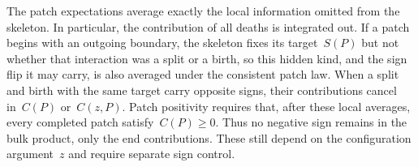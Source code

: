 The patch expectations average exactly the local information omitted from the
skeleton. In particular, the contribution of all  deaths is integrated out. If a patch begins with an outgoing boundary,
the skeleton fixes its target~$S(P)$ but not whether that interaction was a
split or a birth, so this hidden kind, and the sign flip it may carry, is also averaged under the consistent
patch law. When a split and birth with the same target carry opposite signs,
their contributions cancel in~$C(P)$ or~$C(z,P)$. Patch positivity requires
that, after these local averages, every completed patch satisfy~$C(P)\geq0$.
Thus no negative sign remains in the bulk product, only the end contributions. These still depend on the configuration argument~$z$ and require separate sign control.

\FloatBarrier